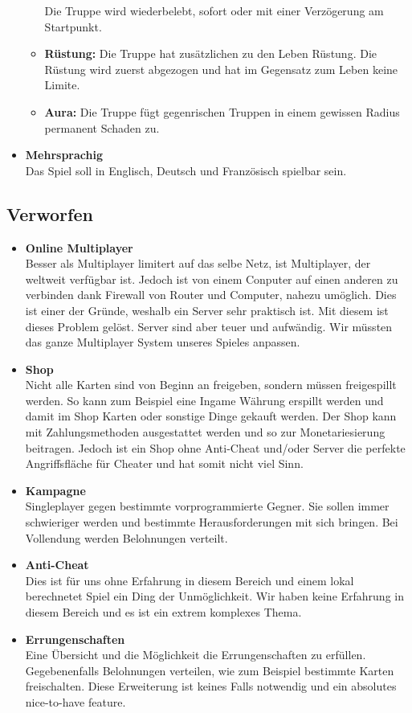 \begin{itemize}
\begin{itemize}
            Die Truppe wird wiederbelebt, sofort oder mit einer Verzögerung am Startpunkt.
        \item \textbf{Rüstung:}
            Die Truppe hat zusätzlichen zu den Leben Rüstung. Die Rüstung wird zuerst abgezogen und hat im Gegensatz zum Leben keine Limite.
        \item \textbf{Aura:}
            Die Truppe fügt gegenrischen Truppen in einem gewissen Radius permanent Schaden zu.
    \end{itemize}
    \item \textbf{Mehrsprachig} \\
        Das Spiel soll in Englisch, Deutsch und Französisch spielbar sein.
\end{itemize}

\subsection*{Verworfen}
\begin{itemize}
    \item \textbf{Online Multiplayer} \\
        Besser als Multiplayer limitert auf das selbe Netz, ist Multiplayer, der weltweit verfügbar ist. Jedoch ist von einem Conputer auf einen anderen zu
        verbinden dank Firewall von Router und Computer, nahezu umöglich. Dies ist einer der Gründe, weshalb ein Server sehr praktisch ist. Mit diesem ist dieses
        Problem gelöst. Server sind aber teuer und aufwändig. Wir müssten das ganze Multiplayer System unseres Spieles anpassen.
    \item \textbf{Shop} \\
        Nicht alle Karten sind von Beginn an freigeben, sondern müssen freigespillt werden.
        So kann zum Beispiel eine Ingame Währung erspillt werden und damit im Shop Karten oder sonstige Dinge gekauft werden.
        Der Shop kann mit Zahlungsmethoden ausgestattet werden und so zur Monetariesierung beitragen.
        Jedoch ist ein Shop ohne Anti-Cheat und/oder Server die perfekte Angriffsfläche für Cheater und hat somit nicht viel Sinn.
    \item \textbf{Kampagne} \\
        Singleplayer gegen bestimmte vorprogrammierte Gegner. Sie sollen immer schwieriger werden und bestimmte Herausforderungen mit sich bringen.
        Bei Vollendung werden Belohnungen verteilt.
    \item \textbf{Anti-Cheat} \\
        Dies ist für uns ohne Erfahrung in diesem Bereich und einem lokal berechnetet Spiel ein Ding der Unmöglichkeit.
        Wir haben keine Erfahrung in diesem Bereich und es ist ein extrem komplexes Thema.
    \item \textbf{Errungenschaften} \\
        Eine Übersicht und die Möglichkeit die Errungenschaften zu erfüllen.
        Gegebenenfalls Belohnungen verteilen, wie zum Beispiel bestimmte Karten freischalten.
        Diese Erweiterung ist keines Falls notwendig und ein absolutes nice-to-have feature.
\end{itemize}

